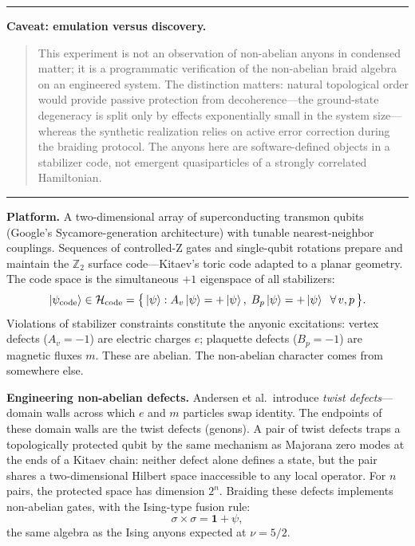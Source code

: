 \medskip
\noindent\rule{\textwidth}{0.6pt}
\medskip

\noindent\textbf{Caveat: emulation versus discovery.}
\begin{quote}
This experiment is not an observation of non-abelian anyons in condensed matter; it is a programmatic verification of the non-abelian braid algebra on an engineered system.  The distinction matters: natural topological order would provide passive protection from decoherence---the ground-state degeneracy is split only by effects exponentially small in the system size---whereas the synthetic realization relies on active error correction during the braiding protocol.  The anyons here are software-defined objects in a stabilizer code, not emergent quasiparticles of a strongly correlated Hamiltonian.
\end{quote}

\medskip
\noindent\rule{\textwidth}{0.6pt}
\medskip

\noindent\textbf{Platform.}
A two-dimensional array of superconducting transmon qubits (Google's Sycamore-generation architecture) with tunable nearest-neighbor couplings.  Sequences of controlled-Z gates and single-qubit rotations prepare and maintain the $\mathbb{Z}_2$ surface code---Kitaev's toric code adapted to a planar geometry.  The code space is the simultaneous $+1$ eigenspace of all stabilizers:
\begin{equation}
  \left|\psi_{\mathrm{code}}\right\rangle \in \mathcal{H}_{\mathrm{code}}
  = \bigl\{\,\left|\psi\right\rangle : A_v\left|\psi\right\rangle = +\left|\psi\right\rangle,\;
    B_p\left|\psi\right\rangle = +\left|\psi\right\rangle\;\;\forall\, v, p\,\bigr\}.
  \label{eq:andersen-code-space}
\end{equation}
Violations of stabilizer constraints constitute the anyonic excitations: vertex defects ($A_v = -1$) are electric charges $e$; plaquette defects ($B_p = -1$) are magnetic fluxes $m$.  These are abelian.  The non-abelian character comes from somewhere else.

\medskip
\noindent\textbf{Engineering non-abelian defects.}
Andersen et al.\ introduce \emph{twist defects}---domain walls across which $e$ and $m$ particles swap identity.  The endpoints of these domain walls are the twist defects (genons).  A pair of twist defects traps a topologically protected qubit by the same mechanism as Majorana zero modes at the ends of a Kitaev chain: neither defect alone defines a state, but the pair shares a two-dimensional Hilbert space inaccessible to any local operator.  For $n$ pairs, the protected space has dimension $2^n$.  Braiding these defects implements non-abelian gates, with the Ising-type fusion rule:
\begin{equation}
  \sigma \times \sigma = \mathbf{1} + \psi,
  \label{eq:andersen-ising-fusion}
\end{equation}
the same algebra as the Ising anyons expected at $\nu = 5/2$.

